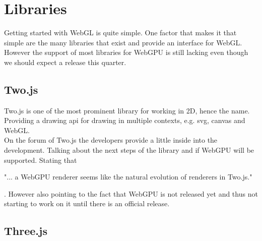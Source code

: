 %
%
% 
% 

\newcommand*{\codeThreejs}[1]{
  \inputminted[
    frame=lines,
    framesep=2mm,
    baselinestretch=1.2,
    linenos,
    fontsize=\scriptsize,
    breaklines=true,
    highlightlines={30-39,43-49,81-84},
    firstline=30,
    lastline=84
  ]{typescript}{#1}}

\newcommand*{\codeBabylon}[1]{
  \inputminted[
    frame=lines,
    framesep=2mm,
    baselinestretch=1.2,
    linenos,
    fontsize=\scriptsize,
    breaklines=true,
    highlightlines={21-27,39-45},
    firstline=21,
    lastline=45
  ]{typescript}{#1}}

\chapter{Libraries}

\label{chap:Libraries}

Getting started with WebGL is quite simple. 
One factor that makes it that simple are the many libraries that exist and provide an interface for WebGL.
However the support of most libraries for WebGPU is still lacking even though we should expect a release this quarter.

\section{Two.js}

Two.js is one of the most prominent library for working in 2D, hence the name.
Providing a drawing api for drawing in multiple contexts, e.g. svg, canvas and WebGL.\\
On the forum of Two.js the developers provide a little inside into the development.
Talking about the next steps of the library and if WebGPU will be supported.
Stating that \begin{displayquote} "... a WebGPU renderer seems like the natural evolution of renderers in Two.js." \end{displayquote}\parencite{two_quote}.
However also pointing to the fact that WebGPU is not released yet and thus not starting to work on it until there is an official release.

\section{Three.js}

